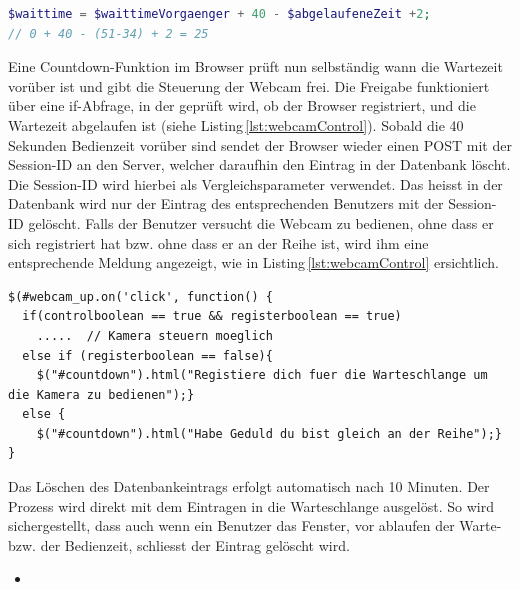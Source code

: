 \vspace{3mm}
\begin{lstlisting}[label=lst:wartezeit,caption=Berechnung der Wartezeit, language=PHP, style=PHP]
$waittime = $waittimeVorgaenger + 40 - $abgelaufeneZeit +2;
// 0 + 40 - (51-34) + 2 = 25
\end{lstlisting}
\vspace{3mm}

\noindent
Eine Countdown-Funktion im Browser prüft nun selbständig wann die Wartezeit vorüber ist und gibt die Steuerung der Webcam frei. Die Freigabe funktioniert über eine if-Abfrage, in der geprüft wird, ob der Browser registriert, und die Wartezeit abgelaufen ist (siehe Listing\,\ref{lst:webcamControl}).
Sobald die 40\,Sekunden Bedienzeit vorüber sind sendet der Browser wieder einen POST mit der Session-ID an den Server, welcher daraufhin den Eintrag in der Datenbank löscht. Die Session-ID wird hierbei als Vergleichsparameter verwendet. Das heisst in der Datenbank wird nur der Eintrag des entsprechenden Benutzers mit der Session-ID gelöscht. Falls der Benutzer versucht die Webcam zu bedienen, ohne dass er sich registriert hat bzw. ohne dass er an der Reihe ist, wird ihm eine entsprechende Meldung angezeigt, wie in Listing\,\ref{lst:webcamControl} ersichtlich.

\vspace{3mm}
\begin{lstlisting}[label=lst:webcamControl, caption=Freigabe der Webcam-Steuerung,language=HTML5, style=htmlcssjs]
$(#webcam_up.on('click', function() {
  if(controlboolean == true && registerboolean == true)
    .....  // Kamera steuern moeglich
  else if (registerboolean == false){
    $("#countdown").html("Registiere dich fuer die Warteschlange um die Kamera zu bedienen");}
  else {
    $("#countdown").html("Habe Geduld du bist gleich an der Reihe");}
}
\end{lstlisting}
\vspace{3mm}

Das Löschen des Datenbankeintrags erfolgt automatisch nach 10 Minuten. Der Prozess wird direkt mit dem Eintragen in die Warteschlange ausgelöst. So wird sichergestellt, dass auch wenn ein Benutzer das Fenster, vor ablaufen der Warte- bzw. der Bedienzeit, schliesst der Eintrag gelöscht wird.
 



\begin{itemize}
\item {}
\end{itemize}
